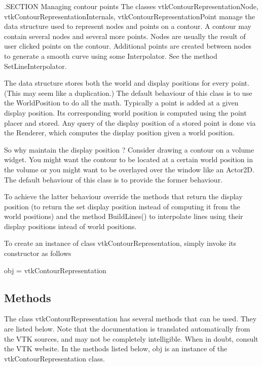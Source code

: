 .S\-E\-C\-T\-I\-O\-N Managing contour points The classes vtk\-Contour\-Representation\-Node, vtk\-Contour\-Representation\-Internals, vtk\-Contour\-Representation\-Point manage the data structure used to represent nodes and points on a contour. A contour may contain several nodes and several more points. Nodes are usually the result of user clicked points on the contour. Additional points are created between nodes to generate a smooth curve using some Interpolator. See the method {\ttfamily Set\-Line\-Interpolator}. \begin{DoxyParagraph}{}
The data structure stores both the world and display positions for every point. (This may seem like a duplication.) The default behaviour of this class is to use the World\-Position to do all the math. Typically a point is added at a given display position. Its corresponding world position is computed using the point placer and stored. Any query of the display position of a stored point is done via the Renderer, which computes the display position given a world position.
\end{DoxyParagraph}
\begin{DoxyParagraph}{}
So why maintain the display position ? Consider drawing a contour on a volume widget. You might want the contour to be located at a certain world position in the volume or you might want to be overlayed over the window like an Actor2\-D. The default behaviour of this class is to provide the former behaviour.
\end{DoxyParagraph}
\begin{DoxyParagraph}{}
To achieve the latter behaviour override the methods that return the display position (to return the set display position instead of computing it from the world positions) and the method {\ttfamily Build\-Lines()} to interpolate lines using their display positions intead of world positions.
\end{DoxyParagraph}
To create an instance of class vtk\-Contour\-Representation, simply invoke its constructor as follows \begin{DoxyVerb}  obj = vtkContourRepresentation
\end{DoxyVerb}
 \hypertarget{vtkwidgets_vtkxyplotwidget_Methods}{}\subsection{Methods}\label{vtkwidgets_vtkxyplotwidget_Methods}
The class vtk\-Contour\-Representation has several methods that can be used. They are listed below. Note that the documentation is translated automatically from the V\-T\-K sources, and may not be completely intelligible. When in doubt, consult the V\-T\-K website. In the methods listed below, {\ttfamily obj} is an instance of the vtk\-Contour\-Representation class. 
